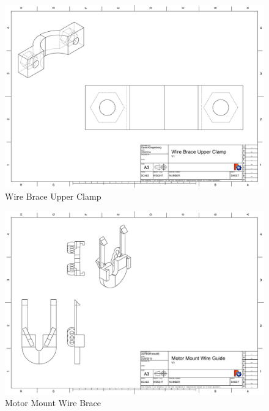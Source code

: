 \documentclass[pdftex,11pt]{article}
\begin{document}
\begin{figure}[!h]
	\centering
		\includegraphics[width=1\textwidth]{./graphics/wire_brace_uper_clamp-eps-converted-to.pdf}
	\caption{Wire Brace Upper Clamp}
	\label{fig:wirebraceupperclamp}
\end{figure}


\begin{figure}[!h]
	\centering
		\includegraphics[width=1\textwidth]{./graphics/MotorMountWireBracket-eps-converted-to.pdf}
	\caption{Motor Mount Wire Brace}
	\label{fig:motormountwirebrace}
\end{figure}
\end{document}
